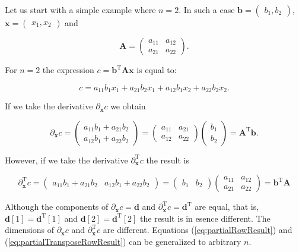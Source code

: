 \documentclass{article}
\begin{document}
Let us start with a simple example where $n = 2$. In such a case $\textbf{b} = \begin{pmatrix} b_1, b_2 \end{pmatrix}$, $\textbf{x} = \begin{pmatrix} x_1, x_2 \end{pmatrix}$ and

\begin{equation}
\textbf{A} = \begin{pmatrix} a_{11} & a_{12} \\ a_{21} & a_{22} \end{pmatrix}.
\end{equation}

\noindent For $n=2$ the expression $c = \textbf{b}^\text{T} \textbf{A} \textbf{x}$ is equal to:

\begin{equation}
c = a_{11} b_1 x_1+a_{21} b_2 x_1+a_{12} b_1 x_2+a_{22} b_2 x_2.
\end{equation}

\noindent If we take the derivative $\partial_\textbf{x} c$ we obtain

\begin{equation}
\partial_\textbf{x} c = \begin{pmatrix} a_{11} b_1+a_{21} b_2 \\ a_{12} b_1+a_{22} b_2  \end{pmatrix} = \begin{pmatrix} a_{11}  & a_{21} \\ a_{12} & a_{22}  \end{pmatrix} \begin{pmatrix} b_1 \\ b_2 \end{pmatrix} = \textbf{A}^\text{T} \textbf{b}.
\label{eq:partialRowResult}
\end{equation}

\noindent However, if we take the derivative $\partial^\text{T}_\textbf{x} c$ the result is

\begin{equation}
\partial^\text{T}_\textbf{x} c = \begin{pmatrix} a_{11} b_1+a_{21} b_2 & a_{12} b_1+a_{22} b_2  \end{pmatrix} = \begin{pmatrix} b_1 & b_2 \end{pmatrix} \begin{pmatrix} a_{11}  & a_{12} \\ a_{21} & a_{22}  \end{pmatrix} = \textbf{b}^\text{T} \textbf{A}
\label{eq:partialTransposeRowResult}
\end{equation}

\noindent Although the components of $\partial_\textbf{x} c = \textbf{d}$ and $\partial^\text{T}_\textbf{x} c = \textbf{d}^\text{T}$ are equal, that is, $\textbf{d}[1] = \textbf{d}^\text{T}[1]$ and $\textbf{d}[2] = \textbf{d}^\text{T}[2]$ the result is in esence different. The dimensions of $\partial_\textbf{x} c$ and $\partial^\text{T}_\textbf{x} c$ are different. Equations (\ref{eq:partialRowResult}) and (\ref{eq:partialTransposeRowResult}) can be generalized to arbitrary $n$.
\end{document}
